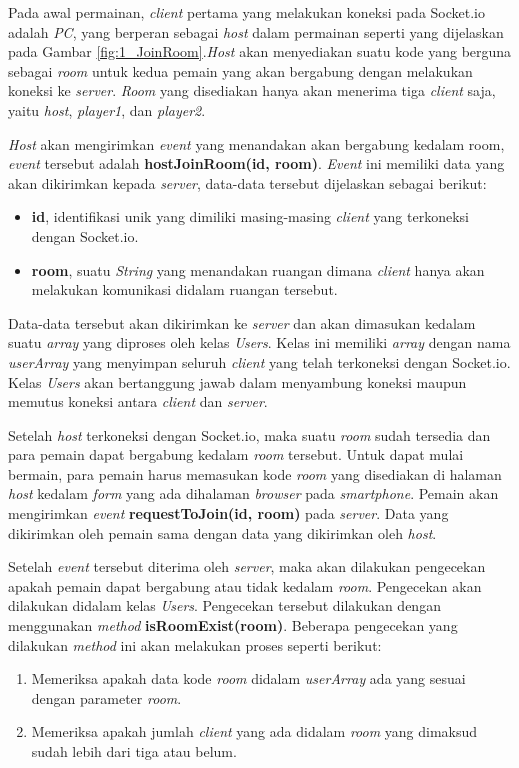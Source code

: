 Pada awal permainan, \textit{client} pertama yang melakukan koneksi pada Socket.io adalah \textit{PC}, yang berperan sebagai \textit{host} dalam permainan seperti yang dijelaskan pada Gambar \ref{fig:1_JoinRoom}.\textit{Host} akan menyediakan suatu kode yang berguna sebagai \textit{room} untuk kedua pemain yang akan bergabung dengan melakukan koneksi ke \textit{server}. \textit{Room} yang disediakan hanya akan menerima tiga \textit{client} saja, yaitu \textit{host}, \textit{player1}, dan \textit{player2}. 

\textit{Host} akan mengirimkan \textit{event} yang menandakan akan bergabung kedalam room, \textit{event} tersebut adalah \textbf{hostJoinRoom(id, room)}. \textit{Event} ini memiliki data yang akan dikirimkan kepada \textit{server}, data-data tersebut dijelaskan sebagai berikut:
\begin{itemize}
	\item \textbf{id}, identifikasi unik yang dimiliki masing-masing \textit{client} yang terkoneksi dengan Socket.io.
	\item \textbf{room}, suatu \textit{String} yang menandakan ruangan dimana \textit{client} hanya akan melakukan komunikasi didalam ruangan tersebut.
\end{itemize}

Data-data tersebut akan dikirimkan ke \textit{server} dan akan dimasukan kedalam suatu \textit{array} yang diproses oleh kelas \textit{Users}. Kelas ini memiliki \textit{array} dengan nama \textit{userArray} yang menyimpan seluruh \textit{client} yang telah terkoneksi dengan Socket.io. Kelas \textit{Users} akan bertanggung jawab dalam menyambung koneksi maupun memutus koneksi antara \textit{client} dan \textit{server}.

Setelah \textit{host} terkoneksi dengan Socket.io, maka suatu \textit{room} sudah tersedia dan para pemain dapat bergabung kedalam \textit{room} tersebut. Untuk dapat mulai bermain, para pemain harus memasukan kode \textit{room} yang disediakan di halaman \textit{host} kedalam \textit{form} yang ada dihalaman \textit{browser} pada \textit{smartphone}. Pemain akan mengirimkan \textit{event} \textbf{requestToJoin(id, room)} pada \textit{server}. Data yang dikirimkan oleh pemain sama dengan data yang dikirimkan oleh \textit{host}. 

Setelah \textit{event} tersebut diterima oleh \textit{server}, maka akan dilakukan pengecekan apakah pemain dapat bergabung atau tidak kedalam \textit{room}. Pengecekan akan dilakukan didalam kelas \textit{Users}. Pengecekan tersebut dilakukan dengan menggunakan \textit{method} \textbf{isRoomExist(room)}. Beberapa pengecekan yang dilakukan \textit{method} ini akan melakukan proses seperti berikut:
\begin{enumerate}
	\item Memeriksa apakah data kode \textit{room} didalam \textit{userArray} ada yang sesuai dengan parameter \textit{room}.
	\item Memeriksa apakah jumlah \textit{client} yang ada didalam \textit{room} yang dimaksud sudah lebih dari tiga atau belum.
\end{enumerate}

